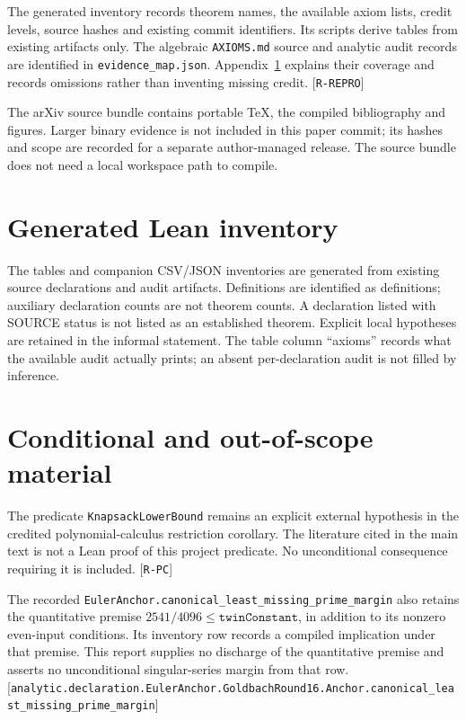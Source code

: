 \documentclass[11pt]{article}
\newcommand{\ev}[1]{{\scriptsize[\nolinkurl{#1}]}}
\theoremstyle{remark}
\begin{document}
The generated inventory records theorem names, the available axiom lists,
credit levels, source hashes and existing commit identifiers. Its scripts
derive tables from existing artifacts only. The algebraic
\texttt{AXIOMS.md} source and analytic audit records are identified in
\texttt{evidence\_map.json}. Appendix~\ref{app:inventory} explains their
coverage and records omissions rather than inventing missing credit.
\ev{R-REPRO}

The arXiv source bundle contains portable TeX, the compiled bibliography
and figures. Larger binary evidence is not included in this paper commit;
its hashes and scope are recorded for a separate author-managed release.
The source bundle does not need a local workspace path to compile.

\clearpage
\appendix
\section{Generated Lean inventory}\label{app:inventory}
The tables and companion CSV/JSON inventories are generated from existing
source declarations and audit artifacts. Definitions are identified as
definitions; auxiliary declaration counts are not theorem counts. A
declaration listed with SOURCE status is not listed as an established
theorem. Explicit local hypotheses are retained in the informal statement.
The table column ``axioms'' records what the available audit actually
prints; an absent per-declaration audit is not filled by inference.




\clearpage
\section{Conditional and out-of-scope material}
\label{app:conditional}
The predicate \texttt{KnapsackLowerBound} remains an explicit external
hypothesis in the credited polynomial-calculus restriction corollary.
The literature cited in the main text is not a Lean proof of this project
predicate. No unconditional consequence requiring it is included.
\ev{R-PC}

The recorded \nolinkurl{EulerAnchor.canonical_least_missing_prime_margin}
also retains the quantitative premise
$2541/4096\leq\texttt{twinConstant}$, in addition to its nonzero even-input
conditions. Its inventory row records a compiled implication under that
premise. This report supplies no discharge of the quantitative premise and
asserts no unconditional singular-series margin from that row.
\ev{analytic.declaration.EulerAnchor.GoldbachRound16.Anchor.canonical_least_missing_prime_margin}
\end{document}

